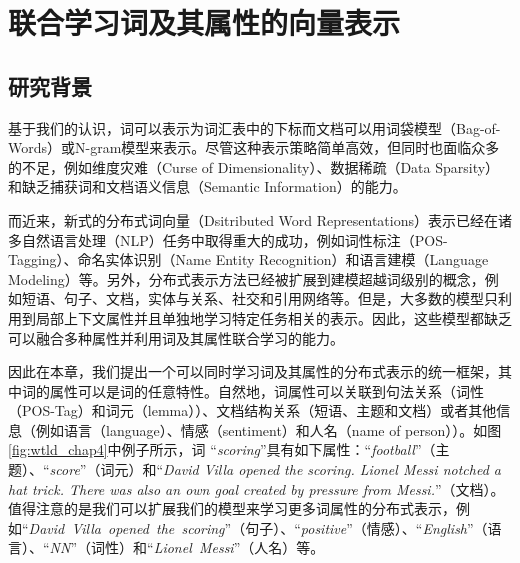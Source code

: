 \documentclass[master]{njuthesis}
\begin{document}
\chapter{联合学习词及其属性的向量表示}\label{chapter4_word_attributes}

\section{研究背景}

基于我们的认识，词可以表示为词汇表中的下标而文档可以用词袋模型（Bag-of-Words）或N-gram模型来表示。尽管这种表示策略简单高效，但同时也面临众多的不足，例如维度灾难（Curse of Dimensionality）、数据稀疏（Data Sparsity）和缺乏捕获词和文档语义信息（Semantic Information）的能力。

而近来，新式的分布式词向量（Dsitributed Word Representations）表示已经在诸多自然语言处理（NLP）任务中取得重大的成功，例如词性标注（POS-Tagging）、命名实体识别（Name Entity Recognition）和语言建模（Language Modeling）等\cite{bengio2003neural,collobert2008unified,turian2010word,huang2015bidirectional}。另外，分布式表示方法已经被扩展到建模超越词级别的概念，例如短语、句子、文档\cite{le2014distributed}，实体与关系\cite{bordes2013translating,socher2013reasoning}、社交和引用网络等\cite{tang2015line}。但是，大多数的模型只利用到局部上下文属性并且单独地学习特定任务相关的表示。因此，这些模型都缺乏可以融合多种属性并利用词及其属性联合学习的能力。

因此在本章，我们提出一个可以同时学习词及其属性的分布式表示的统一框架，其中词的属性可以是词的任意特性。自然地，词属性可以关联到句法关系（词性（POS-Tag）和词元（lemma））、文档结构关系（短语、主题和文档）或者其他信息（例如语言（language）、情感（sentiment）和人名（name of person））。如图\ref{fig:wtld_chap4}中例子所示，词 ``{\it scoring}''具有如下属性：``{\it football}''（主题）、``{\it score}''（词元）和``{\it David Villa opened the scoring. Lionel Messi notched a hat trick. There was also an own goal created by pressure from Messi.}''（文档）。值得注意的是我们可以扩展我们的模型来学习更多词属性的分布式表示，例如``{\it David\ Villa\ opened\ the\ scoring}''（句子）、``{\it positive}''（情感）、``{\it English}''（语言）、``{\it NN}''（词性）和``{\it Lionel\ Messi}''（人名）等。
\end{document}
